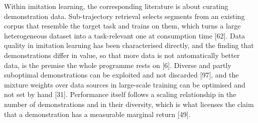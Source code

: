 \documentclass[
  11pt,
]{article}
\begin{document}
Within imitation learning, the corresponding literature is about
curating demonstration data. Sub-trajectory retrieval selects segments
from an existing corpus that resemble the target task and trains on
them, which turns a large heterogeneous dataset into a task-relevant one
at consumption time {[}62{]}. Data quality in imitation learning has
been characterised directly, and the finding that demonstrations differ
in value, so that more data is not automatically better data, is the
premise the whole programme rests on {[}6{]}. Diverse and partly
suboptimal demonstrations can be exploited and not discarded {[}97{]},
and the mixture weights over data sources in large-scale training can be
optimised and not set by hand {[}31{]}. Performance itself follows a
scaling relationship in the number of demonstrations and in their
diversity, which is what licenses the claim that a demonstration has a
measurable marginal return {[}49{]}.
\end{document}
